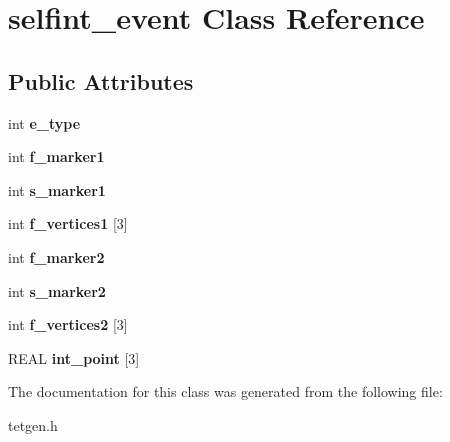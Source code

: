 \hypertarget{classselfint__event}{}\section{selfint\+\_\+event Class Reference}
\label{classselfint__event}
\subsection*{Public Attributes}
\begin{DoxyCompactItemize}
\item 
\mbox{\label{classselfint__event_a313621e8fbe39efe48114d211a4e74c9}} 
int {\bfseries e\+\_\+type}
\item 
\mbox{\label{classselfint__event_abdd1b89c09cb7ffe3dbc7024949a8a71}} 
int {\bfseries f\+\_\+marker1}
\item 
\mbox{\label{classselfint__event_aa33fbbd4542112a3f57bd5a8c61a44e2}} 
int {\bfseries s\+\_\+marker1}
\item 
\mbox{\label{classselfint__event_ad261c6daf3005103ef8b251427b17bcf}} 
int {\bfseries f\+\_\+vertices1} \mbox{[}3\mbox{]}
\item 
\mbox{\label{classselfint__event_a1085a41abed08110d4aba82a55b95601}} 
int {\bfseries f\+\_\+marker2}
\item 
\mbox{\label{classselfint__event_acde4ade72d67895753bee4d42de08a33}} 
int {\bfseries s\+\_\+marker2}
\item 
\mbox{\label{classselfint__event_a1e6c1382a3d64713234782a8a0a49feb}} 
int {\bfseries f\+\_\+vertices2} \mbox{[}3\mbox{]}
\item 
\mbox{\label{classselfint__event_a2888d7c48e2577da1f15b1e7966986e5}} 
R\+E\+AL {\bfseries int\+\_\+point} \mbox{[}3\mbox{]}
\end{DoxyCompactItemize}


The documentation for this class was generated from the following file\+:\begin{DoxyCompactItemize}
\item 
tetgen.\+h\end{DoxyCompactItemize}
